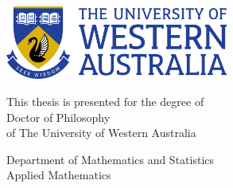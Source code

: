 
\begin{titlepage}

\centering

\vspace*{6em}

{\Huge\bfseries
  \scalebox{0.97}{\titlefirstline} \\
  \scalebox{0.93}{\titlesecondline} \\
}

\vfill

{\Huge
  \scalebox{0.95}{\theauthor} \\
}
{\huge
   \\
}

\vfill

\includegraphics[width=0.55\textwidth]{frontmatter/uwa-logo}

\vspace{2.5em}

{\LARGE
  This thesis is presented for the degree of \\
  Doctor of Philosophy \\
  of The University of Western Australia \\
}

\vspace{2em}

{\Large
  Department of Mathematics and Statistics \\
  Applied Mathematics \\
}

\vspace{1.5em}

{\huge
  \theyear \\
}

\vspace{3em}

\end{titlepage}

